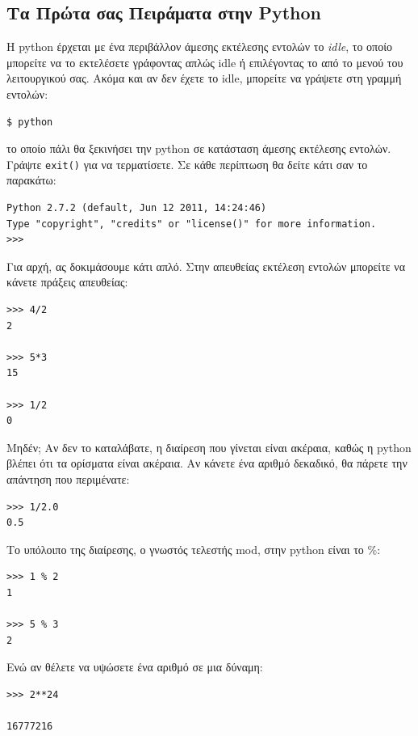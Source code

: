 \subsection{Τα Πρώτα σας Πειράματα στην Python}
%
H python έρχεται με ένα περιβάλλον άμεσης εκτέλεσης εντολών το {\em idle}, το
οποίο μπορείτε να το εκτελέσετε γράφοντας απλώς idle ή επιλέγοντας το από το
μενού του λειτουργικού σας. Ακόμα και αν δεν έχετε το idle, μπορείτε να
γράψετε στη γραμμή εντολών:
%
\begin{verbatim}
$ python
\end{verbatim}
%
το οποίο πάλι θα ξεκινήσει την python σε κατάσταση άμεσης εκτέλεσης εντολών.
Γράψτε {\tt exit()} για να τερματίσετε. Σε κάθε περίπτωση θα δείτε κάτι σαν το
παρακάτω:
%
\begin{verbatim}
Python 2.7.2 (default, Jun 12 2011, 14:24:46)
Type "copyright", "credits" or "license()" for more information.
>>>
\end{verbatim}
%
Για αρχή, ας δοκιμάσουμε κάτι απλό. Στην απευθείας εκτέλεση εντολών μπορείτε
να κάνετε πράξεις απευθείας:

\begin{verbatim}
>>> 4/2
2

>>> 5*3
15

>>> 1/2
0
\end{verbatim}

Μηδέν; Αν δεν το καταλάβατε, η διαίρεση που γίνεται είναι ακέραια, καθώς η
python βλέπει ότι τα ορίσματα είναι ακέραια.  Αν κάνετε ένα αριθμό δεκαδικό,
θα πάρετε την απάντηση που περιμένατε:

\begin{verbatim}
>>> 1/2.0
0.5
\end{verbatim}

Το υπόλοιπο της διαίρεσης, ο γνωστός τελεστής mod, στην python είναι το \%:

\begin{verbatim}
>>> 1 % 2
1

>>> 5 % 3
2
\end{verbatim}

Ενώ αν θέλετε να υψώσετε ένα αριθμό σε μια δύναμη:

\begin{verbatim}
>>> 2**24

16777216
\end{verbatim}

